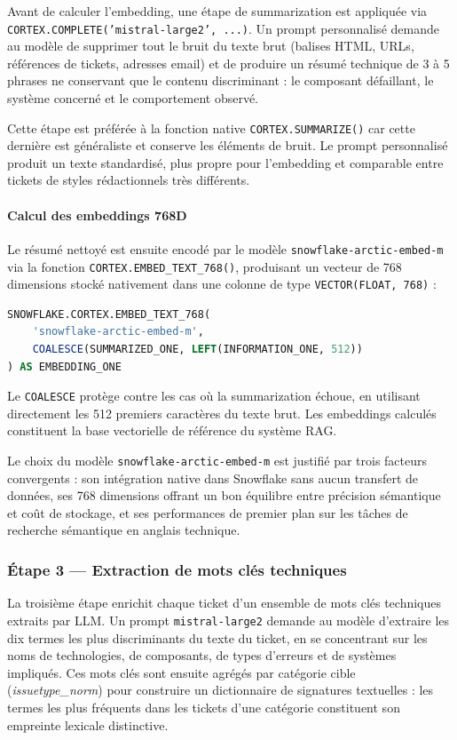 Avant de calculer l'embedding, une étape de summarization est appliquée via \texttt{CORTEX.COMPLETE('mistral-large2', ...)}. Un prompt personnalisé demande au modèle de supprimer tout le bruit du texte brut (balises HTML, URLs, références de tickets, adresses email) et de produire un résumé technique de 3 à 5 phrases ne conservant que le contenu discriminant : le composant défaillant, le système concerné et le comportement observé.

Cette étape est préférée à la fonction native \texttt{CORTEX.SUMMARIZE()} car cette dernière est généraliste et conserve les éléments de bruit. Le prompt personnalisé produit un texte standardisé, plus propre pour l'embedding et comparable entre tickets de styles rédactionnels très différents.

\paragraph{Calcul des embeddings 768D}

Le résumé nettoyé est ensuite encodé par le modèle \texttt{snowflake-arctic-embed-m} via la fonction \texttt{CORTEX.EMBED\_TEXT\_768()}, produisant un vecteur de 768 dimensions stocké nativement dans une colonne de type \texttt{VECTOR(FLOAT, 768)} :

\begin{lstlisting}[language=SQL]
SNOWFLAKE.CORTEX.EMBED_TEXT_768(
    'snowflake-arctic-embed-m',
    COALESCE(SUMMARIZED_ONE, LEFT(INFORMATION_ONE, 512))
) AS EMBEDDING_ONE
\end{lstlisting}

Le \texttt{COALESCE} protège contre les cas où la summarization échoue, en utilisant directement les 512 premiers caractères du texte brut. Les embeddings calculés constituent la base vectorielle de référence du système RAG.

Le choix du modèle \texttt{snowflake-arctic-embed-m} est justifié par trois facteurs convergents : son intégration native dans Snowflake sans aucun transfert de données, ses 768 dimensions offrant un bon équilibre entre précision sémantique et coût de stockage, et ses performances de premier plan sur les tâches de recherche sémantique en anglais technique.

\subsubsection{Étape 3 — Extraction de mots clés techniques}

La troisième étape enrichit chaque ticket d'un ensemble de mots clés techniques extraits par LLM. Un prompt \texttt{mistral-large2} demande au modèle d'extraire les dix termes les plus discriminants du texte du ticket, en se concentrant sur les noms de technologies, de composants, de types d'erreurs et de systèmes impliqués. Ces mots clés sont ensuite agrégés par catégorie cible (\textit{issuetype\_norm}) pour construire un dictionnaire de signatures textuelles : les termes les plus fréquents dans les tickets d'une catégorie constituent son empreinte lexicale distinctive.


